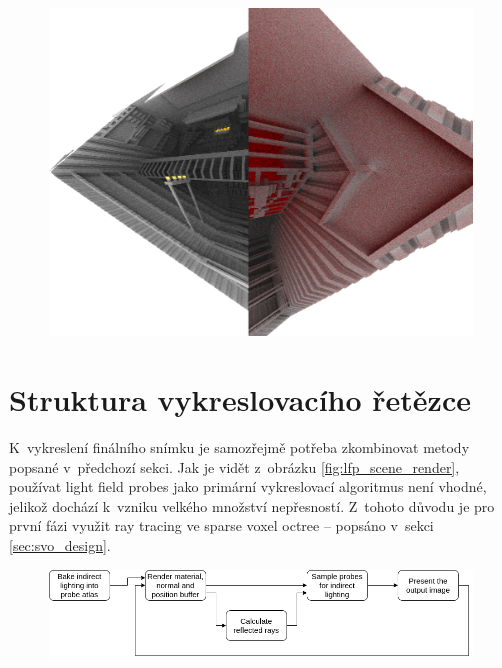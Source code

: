 \begin{figure}[H]
	\centering
	\includegraphics[scale=1]{images/indirect_probe.png}
	\captionsetup{justification=centering}
	\label{fig:diffuse_rays}
\end{figure}


\section{Struktura vykreslovacího řetězce}

K~vykreslení finálního snímku je samozřejmě potřeba zkombinovat metody popsané v~předchozí sekci. Jak je vidět z~obrázku \ref{fig:lfp_scene_render}, používat light field probes jako primární vykreslovací algoritmus není vhodné, jelikož dochází k~vzniku velkého množství nepřesností. Z~tohoto důvodu je pro první fázi využit ray tracing ve sparse voxel octree -- popsáno v~sekci \ref{sec:svo_design}.

\begin{figure}[H]
	\centering
	\includegraphics[scale=0.5]{images/my_render_pipeline.png}
	\captionsetup{justification=centering}
	\label{fig:gbuffer_contents}
\end{figure}

